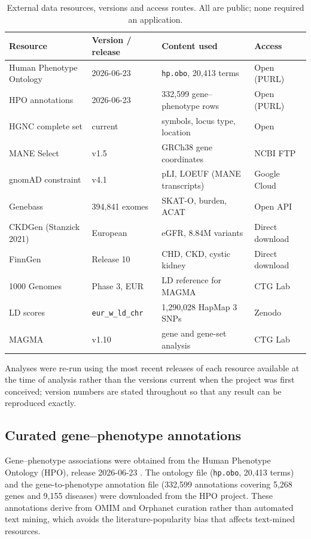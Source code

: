 \documentclass[11pt,a4paper]{article}
\begin{document}
\begin{table}[H]
\centering
\small
\caption{External data resources, versions and access routes. All are public; none required
an application.}
\label{tab:versions}
\begin{tabular}{@{}l l p{4.6cm} l@{}}
\toprule
Resource & Version / release & Content used & Access \\
\midrule
Human Phenotype Ontology & 2026-06-23 & \texttt{hp.obo}, 20,413 terms & Open (PURL) \\
HPO annotations & 2026-06-23 & 332,599 gene--phenotype rows & Open (PURL) \\
HGNC complete set & current & symbols, locus type, location & Open \\
MANE Select & v1.5 & GRCh38 gene coordinates & NCBI FTP \\
gnomAD constraint & v4.1 & pLI, LOEUF (MANE transcripts) & Google Cloud \\
Genebass & 394,841 exomes & SKAT-O, burden, ACAT & Open API \\
CKDGen (Stanzick 2021) & European & eGFR, 8.84M variants & Direct download \\
FinnGen & Release 10 & CHD, CKD, cystic kidney & Direct download \\
1000 Genomes & Phase 3, EUR & LD reference for MAGMA & CTG Lab \\
LD scores & \texttt{eur\_w\_ld\_chr} & 1,290,028 HapMap 3 SNPs & Zenodo \\
MAGMA & v1.10 & gene and gene-set analysis & CTG Lab \\
\bottomrule
\end{tabular}
\end{table}

Analyses were re-run using the most recent releases of each resource available at the time
of analysis rather than the versions current when the project was first conceived; version
numbers are stated throughout so that any result can be reproduced exactly.

\subsection{Curated gene--phenotype annotations}

Gene--phenotype associations were obtained from the Human Phenotype Ontology (HPO), release
2026-06-23 \cite{gargano2024}. The ontology file (\texttt{hp.obo}, 20,413 terms) and the
gene-to-phenotype annotation file (332,599 annotations covering 5,268 genes and 9,155
diseases) were downloaded from the HPO project. These annotations derive from OMIM and
Orphanet curation rather than automated text mining, which avoids the literature-popularity
bias that affects text-mined resources.
\end{document}
